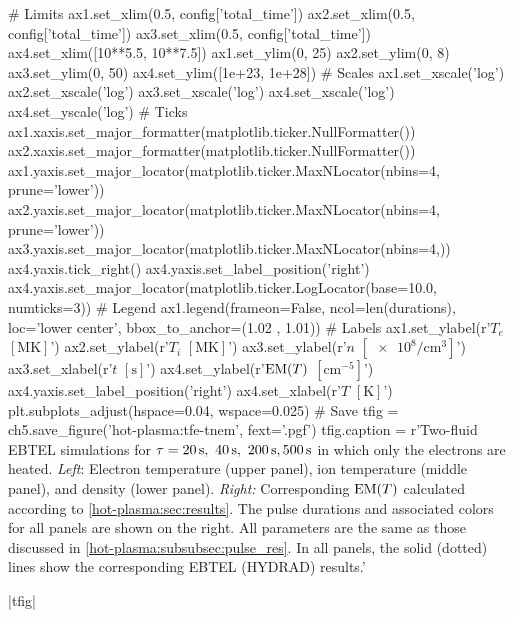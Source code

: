 \begin{pycode}[chapter5]
# Limits
ax1.set_xlim(0.5, config['total_time'])
ax2.set_xlim(0.5, config['total_time'])
ax3.set_xlim(0.5, config['total_time'])
ax4.set_xlim([10**5.5, 10**7.5])
ax1.set_ylim(0, 25)
ax2.set_ylim(0, 8)
ax3.set_ylim(0, 50)
ax4.set_ylim([1e+23, 1e+28])
# Scales
ax1.set_xscale('log')
ax2.set_xscale('log')
ax3.set_xscale('log')
ax4.set_xscale('log')
ax4.set_yscale('log')
# Ticks
ax1.xaxis.set_major_formatter(matplotlib.ticker.NullFormatter())
ax2.xaxis.set_major_formatter(matplotlib.ticker.NullFormatter())
ax1.yaxis.set_major_locator(matplotlib.ticker.MaxNLocator(nbins=4, prune='lower'))
ax2.yaxis.set_major_locator(matplotlib.ticker.MaxNLocator(nbins=4, prune='lower'))
ax3.yaxis.set_major_locator(matplotlib.ticker.MaxNLocator(nbins=4,))
ax4.yaxis.tick_right()
ax4.yaxis.set_label_position('right')
ax4.yaxis.set_major_locator(matplotlib.ticker.LogLocator(base=10.0, numticks=3))
# Legend
ax1.legend(frameon=False, ncol=len(durations), loc='lower center',
            bbox_to_anchor=(1.02 , 1.01))
# Labels
ax1.set_ylabel(r'$T_e$ $[\si{\mega\kelvin}]$')
ax2.set_ylabel(r'$T_i$ $[\si{\mega\kelvin}]$')
ax3.set_ylabel(r'$n$ $[\num{e8}\si{\per\cubic\cm}]$')
ax3.set_xlabel(r'$t$ $[\si{\second}]$')
ax4.set_ylabel(r'$\textup{EM}(T)$ $[\si{\cm\tothe{-5}}]$')
ax4.yaxis.set_label_position('right')
ax4.set_xlabel(r'$T$ $[\si{\kelvin}]$')
plt.subplots_adjust(hspace=0.04, wspace=0.025)
# Save
tfig = ch5.save_figure('hot-plasma:tfe-tnem', fext='.pgf')
tfig.caption = r'Two-fluid EBTEL simulations for $\tau=\SIlist[list-final-separator = {,}]{20;40;200;500}{\second}$ in which only the electrons are heated. \textit{Left}: Electron temperature (upper panel), ion temperature (middle panel), and density (lower panel). \textit{Right:} Corresponding $\emd[T]$ calculated according to \autoref{hot-plasma:sec:results}. The pulse durations and associated colors for all panels are shown on the right. All parameters are the same as those discussed in \autoref{hot-plasma:subsubsec:pulse_res}. In all panels, the solid (dotted) lines show the corresponding EBTEL (HYDRAD) results.'
\end{pycode}
\py[chapter5]|tfig|

